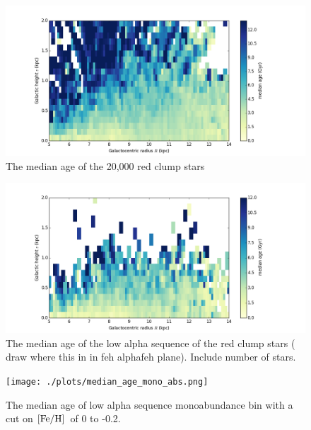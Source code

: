 \documentclass[12pt, preprint]{aastex}
\newcommand{\feh}{\mbox{$\rm [Fe/H]$}}
\begin{document}
\begin{figure}[p!]
\centering
    \includegraphics[scale=0.45]{./plots/median_age_abs.png}
    \caption{The median age of the 20,000 red clump stars  }
\label{fig:redclump_age}
\vspace{360pt}
\end{figure}

\begin{figure}[p!]
\centering
    \includegraphics[scale=0.45]{./plots/median_age_low_alpha_abs.png}
    \caption{The median age of the low alpha sequence of the red clump stars ( draw where this in in feh alphafeh plane). Include number of stars. }
\label{fig:redclump_low}
\vspace{-30pt}
\end{figure}


\begin{figure}[p!]
\centering
    \texttt{[image: ./plots/median\_age\_mono\_abs.png]}
    \caption{The median age of low alpha sequence monoabundance  bin with a cut on  \feh\ of 0 to -0.2. }
\label{fig:redclump_mono}
\end{figure}
\end{document}
